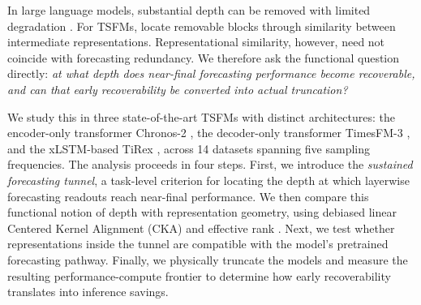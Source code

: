 \documentclass{article} %
\begin{document}
In large language models, substantial depth can be removed with limited degradation \citep{fan2019reducingtransformerdepthdemand, gromov2025unreasonableineffectivenessdeeperlayers, men2024shortgptlayerslargelanguage}. For TSFMs, \citet{wiliński2025exploringrepresentationsinterventionstime} locate removable blocks through similarity between intermediate representations. Representational similarity, however, need not coincide with forecasting redundancy. We therefore ask the functional question directly: \emph{at what depth does near-final forecasting performance become recoverable, and can that early recoverability be converted into actual truncation?}

We study this in three state-of-the-art TSFMs with distinct architectures: the encoder-only transformer Chronos-2 \citep{ansari2025chronos2univariateuniversalforecasting}, the decoder-only transformer TimesFM-3 \citep{das2024decoderonlyfoundationmodeltimeseries}, and the xLSTM-based TiRex \citep{auer2025tirexzeroshotforecastinglong}, across 14 datasets spanning five sampling frequencies. The analysis proceeds in four steps. First, we introduce the \emph{sustained forecasting tunnel}, a task-level criterion for locating the depth at which layerwise forecasting readouts reach near-final performance. We then compare this functional notion of depth with representation geometry, using debiased linear Centered Kernel Alignment (CKA) \citep{JMLR:v13:song12a,kornblith2019similarityneuralnetworkrepresentations,murphy2024correctingbiasedcenteredkernel, cortes2024algorithmslearningkernelsbased} and effective rank \citep{7098875}. Next, we test whether representations inside the tunnel are compatible with the model's pretrained forecasting pathway. Finally, we physically truncate the models and measure the resulting performance-compute frontier to determine how early recoverability translates into inference savings.
\end{document}
